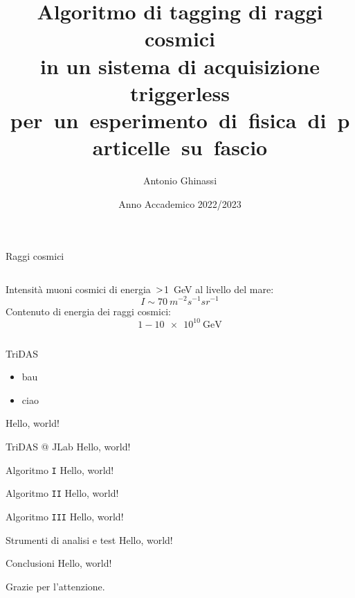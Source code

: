 \documentclass[aspectratio=169]{beamer}
\title{Algoritmo di tagging di raggi cosmici\\in un sistema di acquisizione triggerless\\\mbox{per un esperimento di fisica di particelle su fascio}}
\date{Anno Accademico 2022/2023}
\author{Antonio Ghinassi}
\institute{Alma Mater Studiorum $\cdot$ Università di Bologna}
\begin{document}
  \maketitle
  \begin{frame}{Raggi cosmici}
    
\begin{columns}[onlytextwidth,T]
  \begin{column}{.45\linewidth}
      Intensità muoni cosmici di \mbox{energia $\small>$\SI{1}{\GeV}} al livello del mare:
      $$
          I \sim 70\ m^{-2} s^{-1} sr^{-1}
      $$
      Contenuto di energia dei raggi cosmici:
      $$
      1 - \SI{10e10}{\GeV}
      $$
  \end{column}
\end{columns}

  \end{frame}
  \begin{frame}{TriDAS}
      \begin{itemize}
         \item bau
         \item ciao
      \end{itemize}
    Hello, world!
  \end{frame}
  \begin{frame}{TriDAS @ JLab}
    Hello, world!
  \end{frame}
  \begin{frame}{Algoritmo \texttt{I}}
    Hello, world!
  \end{frame}
  \begin{frame}{Algoritmo \texttt{II}}
    Hello, world!
  \end{frame}
  \begin{frame}{Algoritmo \texttt{III}}
    Hello, world!
  \end{frame}
  \begin{frame}{Strumenti di analisi e test}
    Hello, world!
  \end{frame}
  \begin{frame}{Conclusioni}
    Hello, world!
  \end{frame}
  \begin{frame}[standout]
      Grazie per l'attenzione.
  \end{frame}
\end{document}
